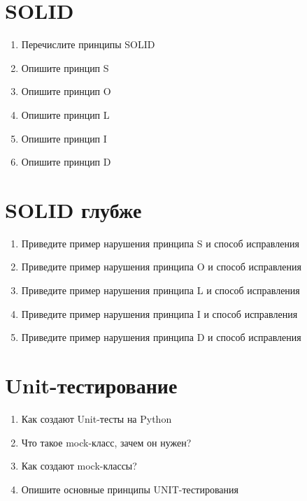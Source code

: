 \documentclass[12pt]{article}
\begin{document}
\section*{SOLID}
\begin{enumerate}
  \item Перечислите принципы SOLID
  \item Опишите принцип S
  \item Опишите принцип O
  \item Опишите принцип L
  \item Опишите принцип I
  \item Опишите принцип D
\end{enumerate}

\section*{SOLID глубже}
\begin{enumerate}
  \item Приведите пример нарушения принципа S и способ исправления
  \item Приведите пример нарушения принципа O и способ исправления
  \item Приведите пример нарушения принципа L и способ исправления
  \item Приведите пример нарушения принципа I и способ исправления
  \item Приведите пример нарушения принципа D и способ исправления
\end{enumerate}

\section*{Unit-тестирование}
\begin{enumerate}
  \item Как создают Unit-тесты на Python
  \item Что такое mock-класс, зачем он нужен?
  \item Как создают mock-классы?
  \item Опишите основные принципы UNIT-тестирования
\end{enumerate}
\end{document}
